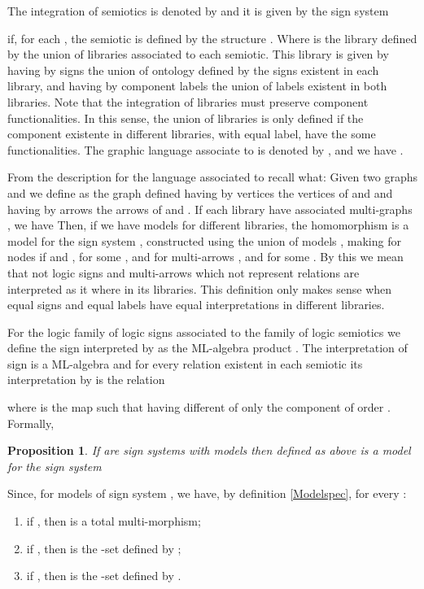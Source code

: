 \documentclass[oribibl]{llncs}
\newtheorem{prop}{Proposition}
\begin{document}
The integration of semiotics  is denoted by  and it is given by the sign system

 if, for each , the semiotic  is defined by the structure . Where  is the library defined by the union of libraries  associated to each semiotic. This library is given by
 having by signs the union of ontology  defined by the signs existent in each library, and having by component labels the union of labels existent in both libraries. Note that the integration of libraries must preserve component functionalities. In this sense, the union of libraries is only defined if the component existente in different libraries, with equal label, have the some functionalities. The graphic language associate to  is denoted by , and we have .

From the description for the language associated to  recall what: Given two graphs  and  we define  as the graph defined having by vertices the vertices of  and  and having by arrows the arrows of  and . If each library  have associated multi-graphs , we have 
Then, if we have models   for different libraries, the homomorphism   is a model for the sign system ,  constructed using the union of models , making for nodes  if  and , for some , and  for multi-arrows , and  for some . By this we mean that not logic signs and multi-arrows which not represent relations are interpreted as it where in its libraries. This definition only makes sense when equal signs and equal labels have equal interpretations in different libraries.

For the logic family of logic signs  associated to the family of logic semiotics  we define the sign  interpreted by  as the ML-algebra product . The interpretation of sign  is a ML-algebra and for every relation  existent in each semiotic  its interpretation by  is the relation

where  is the map such that  having different of  only the component of order . Formally,

\begin{prop}
If  are sign systems with models  then
 defined as above is a model for the sign system  
\end{prop}

Since, for models  of sign system , we have, by definition \ref{Modelspec}, for every :
\begin{enumerate}
  \item if , then  is a total multi-morphism;
  \item if , then  is the -set defined by ;
  \item if , then  is the -set defined by .
\end{enumerate}
\end{document}
